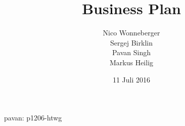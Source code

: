 \documentclass[11pt]{report}
\title{Business Plan}
\author{Nico Wonneberger \\ Sergej Birklin \\ Pavan Singh \\ Markus Heilig}
\date{11 Juli 2016}
\begin{document}
\maketitle

\tableofcontents









pavan: p1206-htwg
\end{document}
